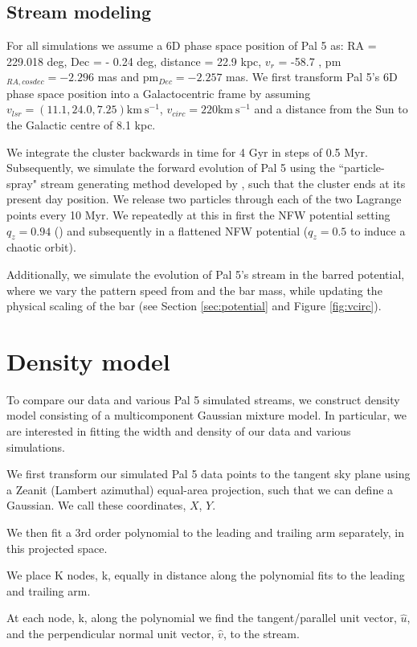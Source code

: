 \documentclass[modern]{aastex62}
\newcommand{\kms}{\ensuremath{\textrm{km}~\textrm{s}^{-1}}}
\begin{document}
\subsection{Stream modeling}
\label{sec:modeling}
For all simulations we assume a 6D phase space position of Pal 5 as: RA = 229.018 deg, Dec = - 0.24 deg, distance = 22.9 kpc, $v_r$ = -58.7 , pm$_{RA,cosdec}= -2.296$ mas and pm$_{Dec} = -2.257$ mas. We first transform Pal 5's 6D phase space position into a Galactocentric frame by assuming $v_{lsr} = (11.1, 24.0, 7.25) \kms$, 
$v_{circ} = 220  \kms$ and a distance from the Sun to the Galactic centre of 8.1 kpc. 

We integrate the cluster backwards in time for 4 Gyr in steps of 0.5 Myr. Subsequently, we simulate the forward evolution of Pal 5 using the ``particle-spray" stream generating method developed by \citet{Fardal:2015}, such that the cluster ends at its present day position. We release two particles through each of the two Lagrange points every 10 Myr. We repeatedly at this in first the NFW potential setting $q_z = 0.94$ (\citealt{Bovy:2016}) and subsequently in a flattened NFW potential ($q_z = 0.5$ to induce a chaotic orbit). 

Additionally, we simulate the evolution of Pal 5's stream in the barred potential, where we vary the pattern speed from and the bar mass, while updating the physical scaling of the bar (see Section \ref{sec:potential} and Figure \ref{fig:vcirc}). 


\section{Density model}
\label{sec:density}
To compare our data and various Pal 5 simulated streams, we construct density model consisting of a multicomponent Gaussian mixture model. In particular, we are interested in fitting the width and density of our data and various simulations.  

We first transform our simulated Pal 5 data points to the tangent sky plane using a Zeanit (Lambert azimuthal) equal-area projection, such that we can define a Gaussian. We call these coordinates, $X$, $Y$.

We then fit a 3rd order polynomial to the leading and trailing arm separately, in this projected space. 

We place K nodes, k, equally in distance along the polynomial fits to the leading and trailing arm. 

At each node, k, along the polynomial we find the tangent/parallel unit vector,  $\hat{u}$, and the perpendicular normal unit vector, $\hat{v}$, to the stream. 
\end{document}
